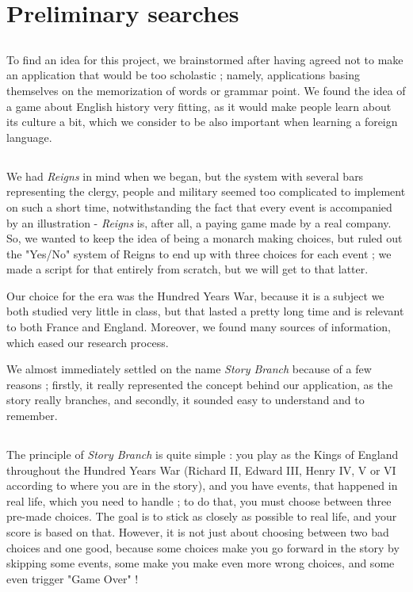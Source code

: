 \documentclass{scrreprt}
\begin{document}
\section{Preliminary searches}

\subsection*{}To find an idea for this project, we brainstormed after having agreed not to make an application that would be too scholastic ; namely, applications basing themselves on the memorization of words or grammar point. We found the idea of a game about English history very fitting, as it would make people learn about its culture a bit, which we consider to be also important when learning a foreign language.

\subsection*{} We had \textit{Reigns} in mind when we began, but the system with several bars representing the clergy, people and military seemed too complicated to implement on such a short time, notwithstanding the fact that every event is accompanied by an illustration - \textit{Reigns} is, after all, a paying game made by a real company. So, we wanted to keep the idea of being a monarch making choices, but ruled out the "Yes/No" system of Reigns to end up with three choices for each event ; we made a script for that entirely from scratch, but we will get to that latter.

Our choice for the era was the Hundred Years War, because it is a subject we both studied very little in class, but that lasted a pretty long time and is relevant to both France and England. Moreover, we found many sources of information, which eased our research process.

We almost immediately settled on the name \textit{Story Branch} because of a few reasons ; firstly, it really represented the concept behind our application, as the story really branches, and secondly, it sounded easy to understand and to remember.

\subsection*{}The principle of \textit{Story Branch} is quite simple : you play as the Kings of England throughout the Hundred Years War (Richard II, Edward III, Henry IV, V or VI according to where you are in the story), and you have events, that happened in real life, which you need to handle ; to do that, you must choose between three pre-made choices. The goal is to stick as closely as possible to real life, and your score is based on that. However, it is not just about choosing between two bad choices and one good, because some choices make you go forward in the story by skipping some events, some make you make even more wrong choices, and some even trigger "Game Over" !
\end{document}
